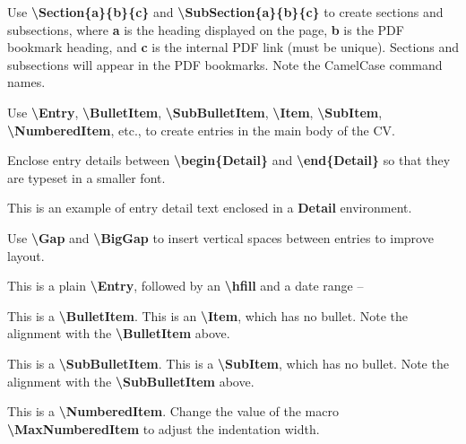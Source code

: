 \documentclass[letterpaper,MMMyyyy,nonstopmode]{./simple-resume-cv-master/simpleresumecv}
\newcommand{\Code}[1]{\mbox{\textbf{#1}}}
\newcommand{\CodeCommand}[1]{\mbox{\textbf{\textbackslash{#1}}}}
\begin{document}
\begin{Body}
\begingroup
	\color{red}
	
	\Gap
	\BulletItem
		Use \CodeCommand{Section\{a\}\{b\}\{c\}} and
		\CodeCommand{SubSection\{a\}\{b\}\{c\}}
		to create sections and subsections, where
		\Code{a} is the heading displayed on the page,
		\Code{b} is the PDF bookmark heading, and
		\Code{c} is the internal PDF link (must be unique).
		Sections and subsections will appear in the PDF bookmarks.
		Note the CamelCase command names.
	
	\Gap
	\BulletItem
		Use
		\CodeCommand{Entry},
		\CodeCommand{BulletItem},
		\CodeCommand{SubBulletItem},
		\CodeCommand{Item},
		\CodeCommand{SubItem},
		\CodeCommand{NumberedItem},
		etc.,
		to create entries in the main body of the CV.
	
	\Gap
		\BulletItem
		Enclose entry details between
		\CodeCommand{begin\{Detail\}} and
		\CodeCommand{end\{Detail\}}
		so that they are typeset in a smaller font.
	\begin{Detail}
		\Item
		This is an example of entry detail text enclosed in a \Code{Detail} environment.
	\end{Detail}

	\Gap
	\BulletItem
		Use \CodeCommand{Gap} and \CodeCommand{BigGap} to insert vertical spaces between entries to improve layout.
	\BigGap

	\Gap
	\Entry
		This is a plain \CodeCommand{Entry},
		followed by an \CodeCommand{hfill} and a date range
		\hfill
		 --

	\Gap
	\BulletItem
		This is a \CodeCommand{BulletItem}.
	\Item
		This is an \CodeCommand{Item}, which has no bullet.
		Note the alignment with the \CodeCommand{BulletItem} above.

	\Gap
	\SubBulletItem
		This is a \CodeCommand{SubBulletItem}.
	\SubItem
		This is a \CodeCommand{SubItem}, which has no bullet.
		Note the alignment with the \CodeCommand{SubBulletItem} above.

	\Gap
	\NumberedItem{[42]}
		This is a \CodeCommand{NumberedItem}.
		Change the value of the macro \CodeCommand{MaxNumberedItem} to adjust the indentation width.
	\BigGap


\end{Body}
\end{document}

